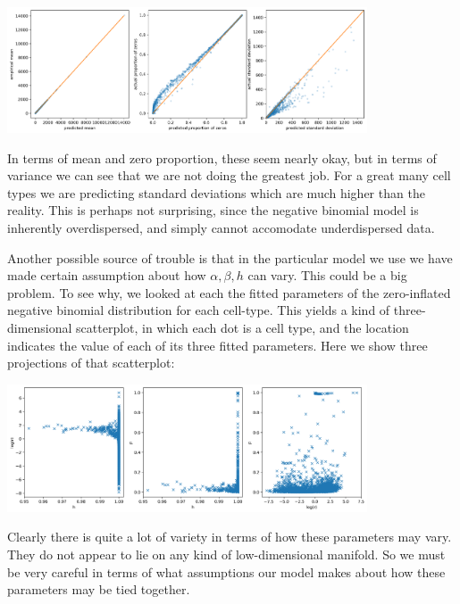 \includegraphics[width=0.8\textwidth]{pics/zinbfitmatch}

In terms of mean and zero proportion, these seem nearly okay, but in terms of variance we can see that we are not doing the greatest job.  For a great many cell types we are predicting standard deviations which are much higher than the reality.  This is perhaps not surprising, since the negative binomial model is inherently overdispersed, and simply cannot accomodate underdispersed data.  

Another possible source of trouble is that in the particular model we use we have made certain assumption about how $\alpha,\beta,h$ can vary.  This could be a big problem.  To see why, we looked at each the fitted parameters of the zero-inflated negative binomial distribution for each cell-type.  This yields a kind of three-dimensional scatterplot, in which each dot is a cell type, and the location indicates the value of each of its three fitted parameters.  Here we show three projections of that scatterplot:

\includegraphics[width=0.8\textwidth]{pics/zinbfitdiversity}

Clearly there is quite a lot of variety in terms of how these parameters may vary.  They do not appear to lie on any kind of low-dimensional manifold.  So we must be very careful in terms of what assumptions our model makes about how these parameters may be tied together.  

% 
% 








































